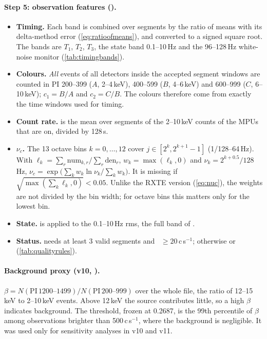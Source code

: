 \paragraph{Step 5: observation features ().}
\begin{itemize}
\item \textbf{Timing.} Each band is combined over segments by the ratio of means with its delta-method error
(\cref{eq:ratioofmeans}), and converted to a signed square root. The bands are $T_1$, $T_2$, $T_3$, the state band
0.1--10\,Hz and the 96--128\,Hz white-noise monitor (\cref{tab:timingbands}).
\item \textbf{Colours.} \emph{All} events of all detectors inside the accepted segment windows are counted in PI 200--399
($A$, 2--4\,keV), 400--599 ($B$, 4--6\,keV) and 600--999 ($C$, 6--10\,keV); $c_1=B/A$ and $c_2=C/B$. The colours therefore
come from exactly the time windows used for timing.
\item \textbf{Count rate.}  is the mean over segments of the 2--10\,keV counts of the MPUs that are on,
divided by 128\,s.
\item \textbf{$\nu_c$.} The 13 octave bins $k=0,\dots,12$ cover $j\in[2^k,2^{k+1}-1]$ (1/128--64\,Hz). With
$\ell_k=\sum_r\mathrm{num}_{k,r}/\sum_r\mathrm{den}_r$, $w_k=\max(\ell_k,0)$ and $\nu_k=2^{k+0.5}/128$\,Hz,
$\nu_c=\exp\bigl(\sum_kw_k\ln\nu_k/\sum_kw_k\bigr)$. It is missing if $\sqrt{\max(\sum_k\ell_k,0)}<0.05$. Unlike the RXTE
version (\cref{eq:nuc}), the weights are not divided by the bin width; for octave bins this matters only for the lowest bin.
\item \textbf{State.}  is applied to the 0.1--10\,Hz rms, the full band of \citet{RemillardMcClintock2006}.
\item \textbf{Status.}  needs at least 3 valid segments and ~$\ge20$\,c\,s$^{-1}$; otherwise
 or  (\cref{tab:qualityrules}).
\end{itemize}

\paragraph{Background proxy (v10, ).} $\beta=N(\mathrm{PI}\,1200\text{--}1499)/N(\mathrm{PI}\,200\text{--}999)$
over the whole file, the ratio of 12--15\,keV to 2--10\,keV events. Above 12\,keV the source contributes little, so a high
$\beta$ indicates background. The threshold, frozen at 0.2687, is the 99th percentile of $\beta$ among observations brighter
than 500\,c\,s$^{-1}$, where the background is negligible. It was used only for sensitivity analyses in v10 and v11.

